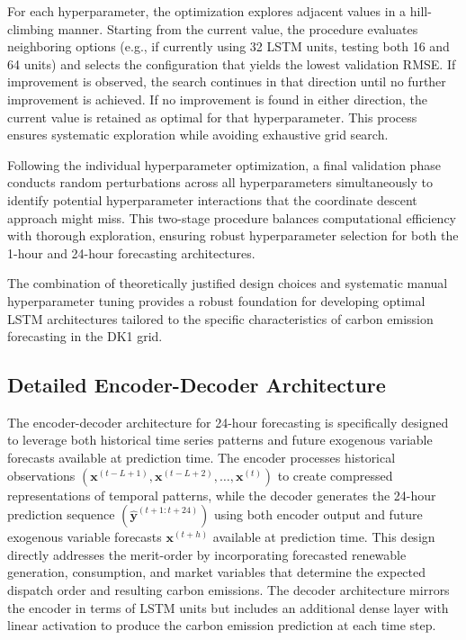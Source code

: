For each hyperparameter, the optimization explores adjacent values in a hill-climbing manner. Starting from the current value, the procedure evaluates neighboring options (e.g., if currently using 32 LSTM units, testing both 16 and 64 units) and selects the configuration that yields the lowest validation RMSE. If improvement is observed, the search continues in that direction until no further improvement is achieved. If no improvement is found in either direction, the current value is retained as optimal for that hyperparameter. This process ensures systematic exploration while avoiding exhaustive grid search.

Following the individual hyperparameter optimization, a final validation phase conducts random perturbations across all hyperparameters simultaneously to identify potential hyperparameter interactions that the coordinate descent approach might miss. This two-stage procedure balances computational efficiency with thorough exploration, ensuring robust hyperparameter selection for both the 1-hour and 24-hour forecasting architectures.

The combination of theoretically justified design choices and systematic manual hyperparameter tuning provides a robust foundation for developing optimal LSTM architectures tailored to the specific characteristics of carbon emission forecasting in the DK1 grid.

\subsection{Detailed Encoder-Decoder Architecture}

The encoder-decoder architecture for 24-hour forecasting is specifically designed to leverage both historical time series patterns and future exogenous variable forecasts available at prediction time. The encoder processes historical observations \((\mathbf{x}^{(t-L+1)}, \mathbf{x}^{(t-L+2)}, \ldots, \mathbf{x}^{(t)})\) to create compressed representations of temporal patterns, while the decoder generates the 24-hour prediction sequence \((\mathbf{\hat{y}}^{(t+1:t+24)})\) using both encoder output and future exogenous variable forecasts \(\mathbf{x}^{(t+h)}\) available at prediction time. This design directly addresses the merit-order by incorporating forecasted renewable generation, consumption, and market variables that determine the expected dispatch order and resulting carbon emissions. The decoder architecture mirrors the encoder in terms of LSTM units but includes an additional dense layer with linear activation to produce the carbon emission prediction at each time step.

